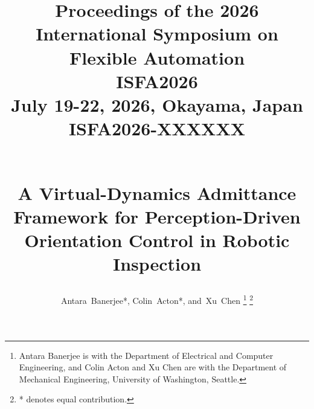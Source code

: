 \documentclass[journal]{IEEEtran}
\begin{document}
%

\title{
  \hfill\parbox{\textwidth}{\raggedleft
    \normalsize Proceedings of the 2026 \\
    International Symposium on Flexible Automation \\
    ISFA2026 \\
    July 19-22, 2026, Okayama, Japan \\[10pt]
    \Large \textbf{ISFA2026-XXXXXX}
  }\\[2em] %
  A Virtual-Dynamics Admittance Framework for Perception-Driven Orientation Control in Robotic Inspection
}
%
%
%

\author{Antara~Banerjee*,
        Colin~Acton*,
        and~Xu~Chen%
\thanks{Antara Banerjee is with the Department
of Electrical and Computer Engineering, and Colin Acton and Xu Chen are with the Department of Mechanical Engineering, University of Washington, Seattle.}%
\thanks{* denotes equal contribution.}}

% 
%
\end{document}
